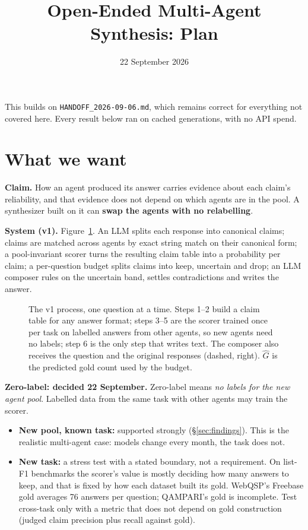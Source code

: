 \documentclass[11pt]{article}
\title{Open-Ended Multi-Agent Synthesis: Plan}
\author{22 September 2026}
\date{}
\newcommand{\code}[1]{\texttt{#1}}
\begin{document}
\maketitle
\vspace{-1.5em}

This builds on \code{HANDOFF\_2026-09-06.md}, which remains correct for
everything not covered here. Every result below ran on cached generations, with
no API spend.

\section{What we want}

\textbf{Claim.} How an agent produced its answer carries evidence about each
claim's reliability, and that evidence does not depend on which agents are in
the pool. A synthesizer built on it can \textbf{swap the agents with no
relabelling}.

\textbf{System (v1).} Figure~\ref{fig:pipeline}. An LLM splits each response
into canonical claims; claims are matched across agents by exact string match on
their canonical form; a pool-invariant scorer turns the resulting claim table
into a probability per claim; a per-question budget splits claims into keep,
uncertain and drop; an LLM composer rules on the uncertain band, settles
contradictions and writes the answer.

\begin{figure}[p]
\centering

\caption{The v1 process, one question at a time. Steps 1--2 build a claim table
for any answer format; steps 3--5 are the scorer trained once per task on
labelled answers from other agents, so new agents need no labels; step 6 is the
only step that writes text. The composer also receives the question and the
original responses (dashed, right). $\hat G$ is the predicted gold count used
by the budget.}
\label{fig:pipeline}
\end{figure}

\textbf{Zero-label: decided 22 September.} Zero-label means \emph{no labels
for the new agent pool}. Labelled data from the same task with other agents may
train the scorer.
\begin{itemize}
  \item \textbf{New pool, known task:} supported strongly (\S\ref{sec:findings}).
        This is the realistic multi-agent case: models change every month, the
        task does not.
  \item \textbf{New task:} a stress test with a stated boundary, not a
        requirement. On list-F1 benchmarks the scorer's value is mostly deciding
        how many answers to keep, and that is fixed by how each dataset built its
        gold. WebQSP's Freebase gold averages 76 answers per question; QAMPARI's
        gold is incomplete. Test cross-task only with a metric that does not
        depend on gold construction (judged claim precision plus recall against
        gold).
\end{itemize}
\end{document}
